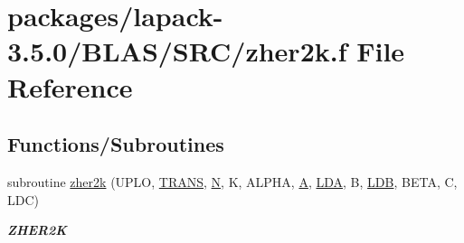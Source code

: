 \hypertarget{lapack-3_85_80_2BLAS_2SRC_2zher2k_8f}{}\section{packages/lapack-\/3.5.0/\+B\+L\+A\+S/\+S\+R\+C/zher2k.f File Reference}
\label{lapack-3_85_80_2BLAS_2SRC_2zher2k_8f}
\subsection*{Functions/\+Subroutines}
\begin{DoxyCompactItemize}
\item 
subroutine \hyperlink{group__complex16__blas__level3_ga7610d30107c40b4009d5c9359d9c6c28}{zher2k} (U\+P\+L\+O, \hyperlink{superlu__enum__consts_8h_a0c4e17b2d5cea33f9991ccc6a6678d62a1f61e3015bfe0f0c2c3fda4c5a0cdf58}{T\+R\+A\+N\+S}, \hyperlink{polmisc_8c_a0240ac851181b84ac374872dc5434ee4}{N}, K, A\+L\+P\+H\+A, \hyperlink{classA}{A}, \hyperlink{example__user_8c_ae946da542ce0db94dced19b2ecefd1aa}{L\+D\+A}, B, \hyperlink{example__user_8c_a50e90a7104df172b5a89a06c47fcca04}{L\+D\+B}, B\+E\+T\+A, C, L\+D\+C)
\begin{DoxyCompactList}\small\item\em {\bfseries Z\+H\+E\+R2\+K} \end{DoxyCompactList}\end{DoxyCompactItemize}
